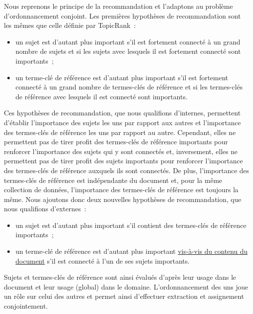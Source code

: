         Nous reprenons le principe de la recommandation et l'adaptons au
        problème d'ordonnancement conjoint. Les premières hypothèses de
        recommandation sont les mêmes que celle définie par TopicRank~:
        \begin{itemize}
          \item{un sujet est d'autant plus important s'il est fortement connecté
                à un grand nombre de sujets et si les sujets avec lesquels il
                est fortement connecté sont importants~;}
          \item{un terme-clé de référence est d'autant plus important s'il est
                fortement connecté à un grand nombre de termes-clés de référence
                et si les termes-clés de référence avec lesquels il est connecté
                sont importants.}
        \end{itemize}
        Ces hypothèses de recommandation, que nous qualifions d'internes,
        permettent d'établir l'importance des sujets les uns par rapport aux
        autres et l'importance des termes-clés de référence les uns par rapport
        au autre. Cependant, elles ne permettent pas de tirer profit des
        termes-clés de référence importants pour renforcer l'importance des
        sujets qui y sont connectés et, inversement, elles ne permettent pas de
        tirer profit des sujets importants pour renforcer l'importance des
        termes-clés de référence auxquels ils sont connectés. De plus,
        l'importance des termes-clés de référence est indépendante du document
        et, pour la même collection de données, l'importance des termes-clés de
        référence est toujours la même. Nous ajoutons donc deux nouvelles
        hypothèses de recommandation, que nous qualifions d'externes~:
        \begin{itemize}
          \item{un sujet est d'autant plus important s'il contient des
                termes-clés de référence importants~;}
          \item{un terme-clé de référence est d'autant plus important
                \underline{vis-à-vis du contenu du document} s'il est connecté à
                l'un de ses sujets importants.}
        \end{itemize}
        Sujets et termes-clés de référence sont ainsi évalués d'après leur usage
        dans le document et leur usage (global) dans le domaine.
        L'ordonnancement des uns joue un rôle sur celui des autres et permet
        ainsi d'effectuer extraction et assignement conjointement.

